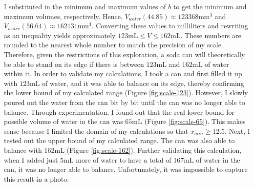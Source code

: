 \documentclass[11pt]{article}
\begin{document}
    I substituted in the minimum and maximum values of $b$ to get the minimum and maximum volumes, respectively. Hence, $V_{water}(44.85) \approx 123368 \mathrm{mm}^3$ and $V_{water}(56.64) \approx 162131 \mathrm{mm}^3$. Converting these values to milliliters and rewriting as an inequality yields approximately $123 \mathrm{mL} \le V \le 162 \mathrm{mL}$. These numbers are rounded to the nearest whole number to match the precision of my scale. Therefore, given the restrictions of this exploration, a soda can will theoretically be able to stand on its edge if there is between $123 \mathrm{mL}$ and $162 \mathrm{mL}$ of water within it. In order to validate my calculations, I took a can and first filled it up with $123 \mathrm{mL}$ of water, and it was able to balance on its edge, thereby confirming the lower bound of my calculated range (Figure \ref{fig:scale-123}). However, I slowly poured out the water from the can bit by bit until the can was no longer able to balance. Through experimentation, I found out that the real lower bound for possible volume of water in the can was $65 \mathrm{mL}$ (Figure \ref{fig:scale-65}). This makes sense because I limited the domain of my calculations so that $x_{min} \ge 12.5$. Next, I tested out the upper bound of my calculated range. The can was also able to balance with $162 \mathrm{mL}$ (Figure \ref{fig:scale-162}). Further validating this calculation, when I added just $5 \mathrm{mL}$ more of water to have a total of $167 \mathrm{mL}$ of water in the can, it was no longer able to balance. Unfortunately, it was impossible to capture this result in a photo.
\end{document}
